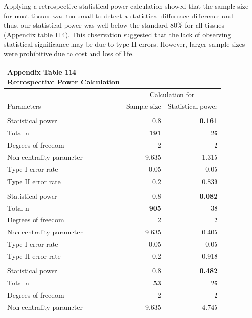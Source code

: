 \documentclass[
  12pt,
  letterpaper,
]{article}
\begin{document}
Applying a retrospective statistical power calculation showed that the sample size for most tissues was too small to detect a statistical difference difference and thus, our statistical power was well below the standard 80\% for all tissues (Appendix table 114). This observation suggested that the lack of observing statistical significance may be due to type II errors. However, larger sample sizes were prohibitive due to cost and loss of life.

\begingroup
\fontsize{12.0pt}{14.4pt}\selectfont
\begin{longtable}{l|rr}
\caption*{
{\large \textbf{Appendix Table 114}} \\ 
{\small \textbf{Retrospective Power Calculation}}
} \\ 
\toprule
 & \multicolumn{2}{c}{Calculation for} \\ 
\cmidrule(lr){2-3}
Parameters & {Sample size} & {Statistical power} \\ 
\midrule\addlinespace[2.5pt]
\multicolumn{3}{l}{Brain} \\[2.5pt] 
\midrule\addlinespace[2.5pt]
Statistical power & 0.8 & {\bfseries 0.161} \\ 
Total n & {\bfseries 191} & 26 \\ 
Degrees of freedom & 2 & 2 \\ 
Non-centrality parameter & 9.635 & 1.315 \\ 
Type I error rate & 0.05 & 0.05 \\ 
Type II error rate & 0.2 & 0.839 \\ 
\midrule\addlinespace[2.5pt]
\multicolumn{3}{l}{Ear} \\[2.5pt] 
\midrule\addlinespace[2.5pt]
Statistical power & 0.8 & {\bfseries 0.082} \\ 
Total n & {\bfseries 905} & 38 \\ 
Degrees of freedom & 2 & 2 \\ 
Non-centrality parameter & 9.635 & 0.405 \\ 
Type I error rate & 0.05 & 0.05 \\ 
Type II error rate & 0.2 & 0.918 \\ 
\midrule\addlinespace[2.5pt]
\multicolumn{3}{l}{Eye} \\[2.5pt] 
\midrule\addlinespace[2.5pt]
Statistical power & 0.8 & {\bfseries 0.482} \\ 
Total n & {\bfseries 53} & 26 \\ 
Degrees of freedom & 2 & 2 \\ 
Non-centrality parameter & 9.635 & 4.745 \\ 

\end{longtable}
\end{document}
